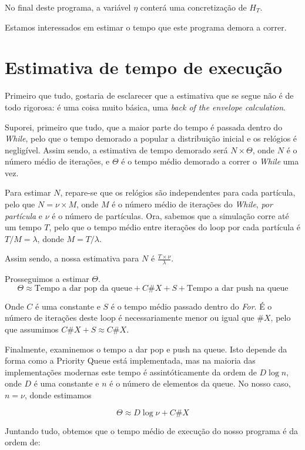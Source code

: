 \documentclass{article}
\begin{document}
	\bigskip
	
	No final deste programa, a variável $\eta$ conterá uma concretização de $H_T$.
	
	Estamos interessados em estimar o tempo que este programa demora a correr.
	
	\section{Estimativa de tempo de execução}
	
	Primeiro que tudo, gostaria de esclarecer que a estimativa que se segue não é de todo rigorosa: é uma coisa muito básica, uma \emph{back of the envelope calculation}.
	
	Suporei, primeiro que tudo, que a maior parte do tempo é passada dentro do \emph{While}, pelo que o tempo demorado a popular a distribuição inicial e os relógios é negligível. Assim sendo, a estimativa de tempo demorado será $N \times \Theta$, onde $N$ é o número médio de iterações, e $\Theta$ é o tempo médio demorado a correr o \emph{While} uma vez.
	
	Para estimar $N$, repare-se que os relógios são independentes para cada partícula, pelo que $N = \nu \times M$, onde $M$ é o número médio de iterações do \emph{While}, \emph{por partícula} e $\nu$ é o número de partículas. Ora, sabemos que a simulação corre até um tempo $T$, pelo que o tempo médio entre iterações do loop por cada partícula é $T/M = \lambda$, donde $M = T/\lambda$.
	
	Assim sendo, a nossa estimativa para $N$ é $\frac{T \times \nu}\lambda$.
	
	Prosseguimos a estimar $\Theta$.
	\[\Theta \approx \text{Tempo a dar pop da queue} + C \#X + S + \text{Tempo a dar push na queue}\]
	
	Onde $C$ é uma constante e $S$ é o tempo médio passado dentro do \emph{For}. É o número de iterações deste loop é necessariamente menor ou igual que $\#X$, pelo que assumimos $C \#X + S \approx C \#X$.
	
	Finalmente, examinemos o tempo a dar pop e push na queue. Isto depende da forma como a Priority Queue está implementada, mas na maioria das implementações modernas este tempo é assintóticamente da ordem de $D \log n$, onde $D$ é uma constante e $n$ é o número de elementos da queue. No nosso caso, $n = \nu$, donde estimamos
	
	\[\Theta \approx D \log \nu + C \#X\]
	
	Juntando tudo, obtemos que o tempo médio de execução do nosso programa é da ordem de:
	
\end{document}
